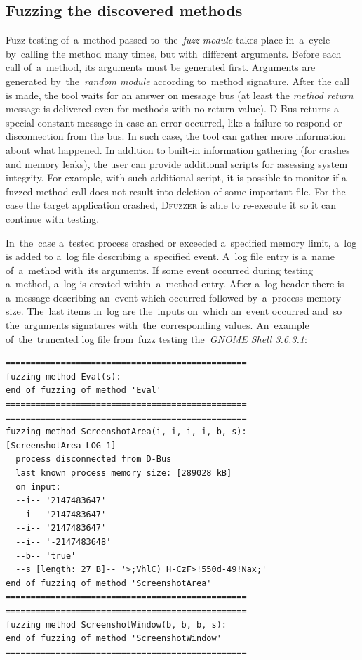 \documentclass[conference]{IEEEtran}
\begin{document}
\subsection{Fuzzing the discovered methods} Fuzz testing of~a~method passed
to~the~\emph{fuzz module} takes place in~a~cycle by~calling the method many
times, but with~different arguments.  Before each call of~a~method, its
arguments must be generated first. Arguments are generated by~the~\emph{random
module} according to~method signature. After the call is made, the tool waits
for an answer on message bus (at least the \textit{method return} message is
delivered even for methods with no return value). D-Bus returns a special
constant message in case an error occurred, like a failure to respond or
disconnection from the bus. In such case, the tool can gather more information
about what happened. In addition to built-in information gathering (for crashes
and memory leaks), the user can provide additional scripts for assessing
system integrity. For example, with such additional script, it is possible to
monitor if a fuzzed method call does not result into deletion of some important
file. For the case the target application crashed, \textsc{Dfuzzer} is able to
re-execute it so it can continue with testing.


In~the~case a~tested process crashed or exceeded a~specified memory limit,
a~log is added to a~log file describing a~specified event. A~log file entry is
a~name of~a~method with~its arguments. If some event occurred during testing
a~method, a~log is created within~a~method entry. After a~log header there is
a~message describing an~event which occurred followed by~a~process memory size.
The~last items in~log are the~inputs on~which an~event occurred and~so
the~arguments signatures with~the~corresponding values. An~example
of~the~truncated log file from~fuzz testing the~\emph{GNOME Shell 3.6.3.1}:


{
\footnotesize
\begin{verbatim}
================================================
fuzzing method Eval(s):
end of fuzzing of method 'Eval'
================================================
================================================
fuzzing method ScreenshotArea(i, i, i, i, b, s):
[ScreenshotArea LOG 1]
  process disconnected from D-Bus
  last known process memory size: [289028 kB]
  on input:
  --i-- '2147483647'
  --i-- '2147483647'
  --i-- '2147483647'
  --i-- '-2147483648'
  --b-- 'true'
  --s [length: 27 B]-- '>;VhlC) H-CzF>!550d-49!Nax;'
end of fuzzing of method 'ScreenshotArea'
================================================
================================================
fuzzing method ScreenshotWindow(b, b, b, s):
end of fuzzing of method 'ScreenshotWindow'
================================================
\end{verbatim}
}
\end{document}
